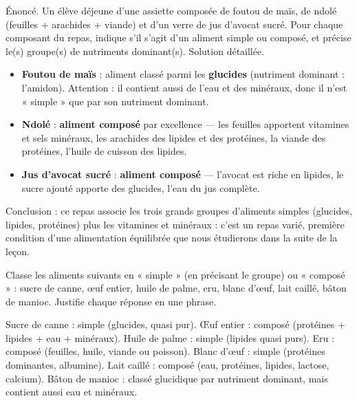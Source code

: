 \documentclass[11pt]{article}
\begin{document}
\begin{exoresolu}
Énoncé. Un élève déjeune d'une assiette composée de foutou de maïs, de ndolé (feuilles + arachides + viande) et d'un verre de jus d'avocat sucré. Pour chaque composant du repas, indique s'il s'agit d'un aliment simple ou composé, et précise le(s) groupe(s) de nutriments dominant(s).
\tcblower
Solution détaillée.
\begin{itemize}
\item \textbf{Foutou de maïs} : aliment classé parmi les \textbf{glucides} (nutriment dominant : l'amidon). Attention : il contient aussi de l'eau et des minéraux, donc il n'est « simple » que par son nutriment dominant.
\item \textbf{Ndolé} : \textbf{aliment composé} par excellence — les feuilles apportent vitamines et sels minéraux, les arachides des lipides et des protéines, la viande des protéines, l'huile de cuisson des lipides.
\item \textbf{Jus d'avocat sucré} : \textbf{aliment composé} — l'avocat est riche en lipides, le sucre ajouté apporte des glucides, l'eau du jus complète.
\end{itemize}
Conclusion : ce repas associe les trois grands groupes d'aliments simples (glucides, lipides, protéines) plus les vitamines et minéraux : c'est un repas varié, première condition d'une alimentation équilibrée que nous étudierons dans la suite de la leçon.
\end{exoresolu}

\begin{exercice}
Classe les aliments suivants en « simple » (en précisant le groupe) ou « composé » : sucre de canne, œuf entier, huile de palme, eru, blanc d'œuf, lait caillé, bâton de manioc. Justifie chaque réponse en une phrase.
\end{exercice}

\begin{corrige}
Sucre de canne : simple (glucides, quasi pur). Œuf entier : composé (protéines + lipides + eau + minéraux). Huile de palme : simple (lipides quasi purs). Eru : composé (feuilles, huile, viande ou poisson). Blanc d'œuf : simple (protéines dominantes, albumine). Lait caillé : composé (eau, protéines, lipides, lactose, calcium). Bâton de manioc : classé glucidique par nutriment dominant, mais contient aussi eau et minéraux.
\end{corrige}
\end{document}
